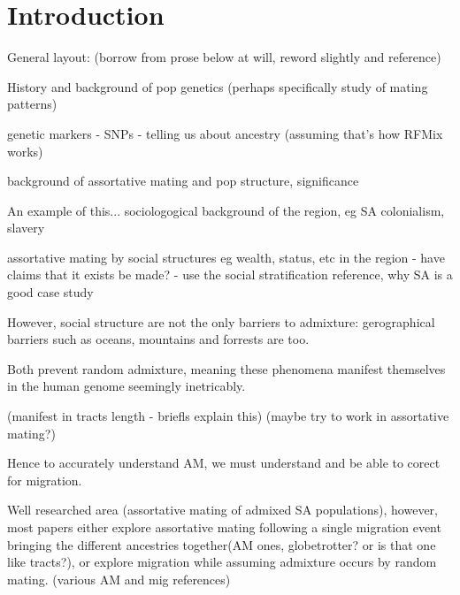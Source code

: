 \documentclass[11pt]{article}
\begin{document}
\section{Introduction}

General layout: (borrow from prose below at will, reword slightly and reference)

History and background of pop genetics (perhaps specifically study of mating patterns)

genetic markers - SNPs - telling us about ancestry (assuming that's how RFMix works)

background of assortative mating and pop structure, significance

An example of this... sociologogical background of the region, eg SA colonialism, slavery

assortative mating by social structures eg wealth, status, etc in the region - have claims that it exists be made? - use the social stratification reference, why SA is a good case study

However, social structure are not the only barriers to admixture: gerographical barriers such as oceans, mountains and forrests are too.

Both prevent random admixture, meaning these phenomena manifest themselves in the human genome seemingly inetricably.

(manifest in tracts length - briefls explain this)
(maybe try to work in assortative mating?)

Hence to accurately understand AM, we must understand and be able to corect for migration.

Well researched area (assortative mating of admixed SA populations), however, most papers either explore assortative mating following a single migration event bringing the different ancestries together(AM ones, globetrotter? or is that one like tracts?), or explore migration while assuming admixture occurs by random mating. (various AM and mig references)
\end{document}
